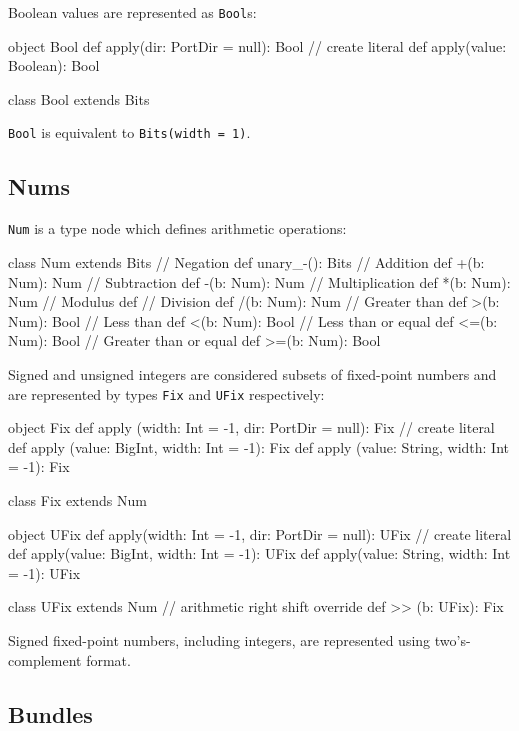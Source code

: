 \documentclass[10pt,twocolumn]{article}
\def\code#1{{\small\tt #1}}
\begin{document}
Boolean values are represented as \code{Bool}s:

\begin{scala}
object Bool {
  def apply(dir: PortDir = null): Bool
  // create literal
  def apply(value: Boolean): Bool
}

class Bool extends Bits
\end{scala}

\noindent
\code{Bool} is equivalent to \code{Bits(width = 1)}.

\subsection{Nums}

\code{Num} is a type node which defines arithmetic operations:

\begin{scala}
class Num extends Bits {
  // Negation
  def unary_-(): Bits
  // Addition
  def +(b: Num): Num
  // Subtraction
  def -(b: Num): Num
  // Multiplication
  def *(b: Num): Num
  // Modulus
  def %
  // Division
  def /(b: Num): Num
  // Greater than
  def >(b: Num): Bool
  // Less than
  def <(b: Num): Bool
  // Less than or equal
  def <=(b: Num): Bool
  // Greater than or equal
  def >=(b: Num): Bool
}
\end{scala}

Signed and unsigned integers
are considered subsets of fixed-point numbers and are represented by
types \code{Fix} and \code{UFix} respectively:

\begin{scala}
object Fix {
  def apply (width: Int = -1, 
             dir: PortDir = null): Fix
  // create literal
  def apply (value: BigInt, width: Int = -1): Fix
  def apply (value: String, width: Int = -1): Fix
}

class Fix extends Num 

object UFix {
  def apply(width: Int = -1, 
            dir: PortDir = null): UFix
  // create literal
  def apply(value: BigInt, width: Int = -1): UFix
  def apply(value: String, width: Int = -1): UFix
}

class UFix extends Num {
  // arithmetic right shift
  override def >> (b: UFix): Fix
}
\end{scala}

\noindent
Signed fixed-point
numbers, including integers, are represented using two's-complement
format.  

\subsection{Bundles}
\end{document}
